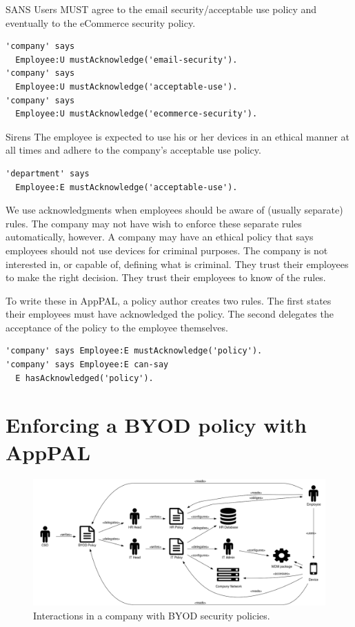 \documentclass[thesis.tex]{subfiles}
\begin{document}
\begin{policyrule}{SANS}
  Users MUST agree to the email security/acceptable use policy and eventually to the eCommerce security policy.
  \begin{lstlisting}
'company' says
  Employee:U mustAcknowledge('email-security').
'company' says
  Employee:U mustAcknowledge('acceptable-use').
'company' says
  Employee:U mustAcknowledge('ecommerce-security').
  \end{lstlisting}
\end{policyrule}
\begin{policyrule}{Sirens}
  The employee is expected to use his or her devices in an ethical manner at all times and adhere to the company's acceptable use policy.
  \begin{lstlisting}
'department' says
  Employee:E mustAcknowledge('acceptable-use').
  \end{lstlisting}
\end{policyrule}

We use acknowledgments when employees should be aware of (usually separate) rules.
The company may not have wish to enforce these separate rules automatically, however.
A company may have an ethical policy that says employees should not use devices for criminal purposes.
The company is not interested in, or capable of, defining what is criminal.
They trust their employees to make the right decision.
They trust their employees to know of the rules.

To write these in AppPAL, a policy author creates two rules.
  The first states their employees must have acknowledged the policy.
  The second delegates the acceptance of the policy to the employee themselves.
\begin{lstlisting}
'company' says Employee:E mustAcknowledge('policy').
'company' says Employee:E can-say
  E hasAcknowledged('policy').
\end{lstlisting}


\section{Enforcing a BYOD policy with AppPAL}

\begin{figure}
  \centering
  \includegraphics[width=\textwidth]{figures/mdm-overview.pdf}
  \caption{Interactions in a company with BYOD security policies.}
  \label{fig:mdm-overview}
\end{figure}
\end{document}
